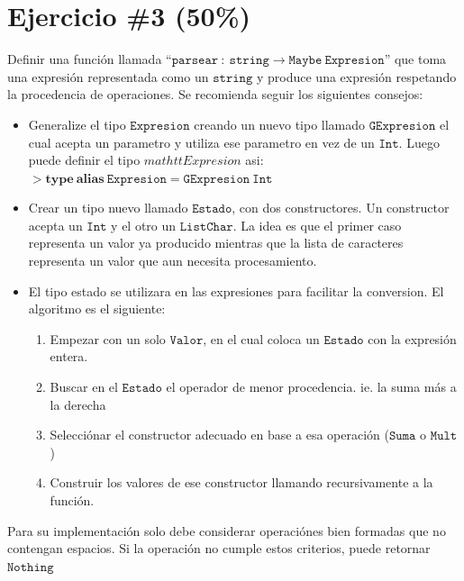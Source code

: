 \documentclass{article}
\begin{document}
\section*{Ejercicio \#3 (50\%)}
Definir una funci\'on llamada ``$\mathtt{parsear}\ :\ \mathtt{string}\rightarrow\mathtt{Maybe\ Expresion}$'' que
toma una expresi\'on representada como un $\mathtt{string}$ y produce una expresi\'on respetando la
procedencia de operaciones. Se recomienda seguir los siguientes consejos:
\begin{itemize}
        \item{Generalize el tipo $\mathtt{Expresion}$ creando un nuevo tipo llamado
        $\mathtt{GExpresion}$ el cual acepta un parametro y utiliza ese parametro
        en vez de un $\mathtt{Int}$. Luego puede definir el tipo $mathtt{Expresion}$ asi:\\
        $>\mathbf{type\ alias}\ \mathtt{Expresion}=\mathtt{GExpresion}\ \mathtt{Int}$}
        \item{Crear un tipo nuevo llamado $\mathtt{Estado}$, con dos constructores. Un
        constructor acepta un $\mathtt{Int}$ y el otro un $\mathtt{List Char}$. La idea
        es que el primer caso representa un valor ya producido mientras que la lista
        de caracteres representa un valor que aun necesita procesamiento.}
        \item{El tipo estado se utilizara en las expresiones para facilitar
        la conversion. El algoritmo es el siguiente:
        \begin{enumerate}
                \item{Empezar con un solo $\mathtt{Valor}$, en el cual coloca un
                $\mathtt{Estado}$ con la expresi\'on entera.}
                \item{Buscar en el $\mathtt{Estado}$ el operador de menor
                procedencia. ie. la suma m\'as a la derecha}
                \item{Selecci\'onar el constructor adecuado en base a esa operaci\'on ($\mathtt{Suma}$ o $\mathtt{Mult}$)}
                \item{Construir los valores de ese constructor llamando recursivamente a la funci\'on.}
        \end{enumerate}
        }
\end{itemize}
Para su implementaci\'on solo debe considerar operaci\'ones bien formadas que no contengan espacios. Si la
operaci\'on no cumple estos criterios, puede retornar $\mathtt{Nothing}$
\end{document}
